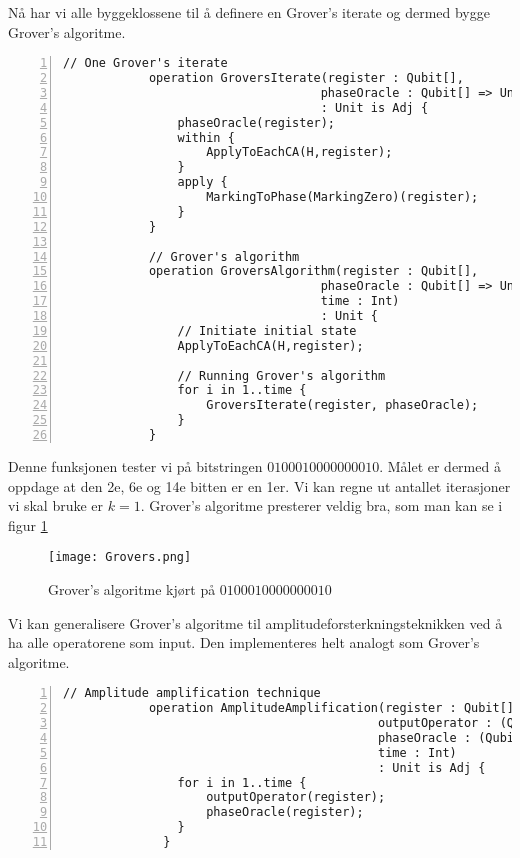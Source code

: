         Nå har vi alle byggeklossene til å definere en Grover's iterate og dermed bygge Grover's algoritme.

        \begin{Verbatim}[gobble=2, numbers=left, frame=lines,
            framesep=3mm,
            label={[Beginning of code]End of code}]
            // One Grover's iterate
            operation GroversIterate(register : Qubit[], 
                                    phaseOracle : Qubit[] => Unit is Adj) 
                                    : Unit is Adj {
                phaseOracle(register);
                within {
                    ApplyToEachCA(H,register);
                }
                apply {
                    MarkingToPhase(MarkingZero)(register);
                }
            }

            // Grover's algorithm
            operation GroversAlgorithm(register : Qubit[], 
                                    phaseOracle : Qubit[] => Unit is Adj, 
                                    time : Int) 
                                    : Unit {
                // Initiate initial state
                ApplyToEachCA(H,register);

                // Running Grover's algorithm
                for i in 1..time {
                    GroversIterate(register, phaseOracle);
                }
            }
        \end{Verbatim}

        Denne funksjonen tester vi på bitstringen $0100010000000010$. Målet er dermed å oppdage at den 2e, 6e og 14e bitten er en 1er. Vi kan regne ut antallet iterasjoner vi skal bruke er $k = 1$. Grover's algoritme presterer veldig bra, som man kan se i figur \ref{fig:Grover's}

        \begin{figure}
            \begin{center}
                \caption{Grover's algoritme kjørt på $0100010000000010$}
                \texttt{[image: Grovers.png]}
                \label{fig:Grover's}
            \end{center}
        \end{figure}

        Vi kan generalisere Grover's algoritme til amplitudeforsterkningsteknikken ved å ha alle operatorene som input. Den implementeres helt analogt som Grover's algoritme.

        \begin{Verbatim}[gobble=2, numbers=left, frame=lines,
            framesep=3mm,
            label={[Beginning of code]End of code}]
            // Amplitude amplification technique
            operation AmplitudeAmplification(register : Qubit[], 
                                            outputOperator : (Qubit[] => Unit is Adj), 
                                            phaseOracle : (Qubit[] => Unit is Adj), 
                                            time : Int) 
                                            : Unit is Adj {
                for i in 1..time {
                    outputOperator(register);
                    phaseOracle(register);
                }
              }
        \end{Verbatim}

